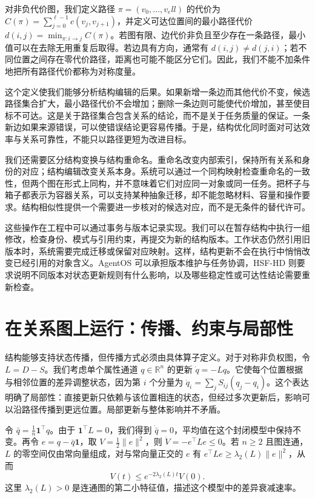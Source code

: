 对非负代价图，我们定义路径 $\pi=(v_0,\ldots,v_ell)$ 的代价为 $C(\pi)=\sum_{j=0}^{\ell-1}c(v_j,v_{j+1})$，并定义可达位置间的最小路径代价 $d(i,j)=\min_{\pi:i\to j}C(\pi)$。若图有限、边代价非负且至少存在一条路径，最小值可以在去除无用重复后取得。若边具有方向，通常有 $d(i,j)\neq d(j,i)$；若不同位置之间存在零代价路径，距离也可能不能区分它们。因此，我们不能不加条件地把所有路径代价都称为对称度量。

这个定义使我们能够分析结构编辑的后果。如果新增一条边而其他代价不变，候选路径集合扩大，最小路径代价不会增加；删除一条边则可能使代价增加，甚至使目标不可达。这是关于路径集合包含关系的结论，而不是关于任务质量的保证。一条新边如果来源错误，可以使错误结论更容易传播。于是，结构优化同时面对可达效率与关系可靠性，不能只以路径更短为改进目标。

我们还需要区分结构变换与结构重命名。重命名改变内部索引，保持所有关系和身份的对应；结构编辑改变关系本身。系统可以通过一个同构映射检查重命名的一致性，但两个图在形式上同构，并不意味着它们对应同一对象或同一任务。把杯子与箱子都表示为容器关系，可以支持某种抽象迁移，却不能忽略材料、容量和操作要求。结构相似性提供一个需要进一步核对的候选对应，而不是无条件的替代许可。

这些操作在工程中可以通过事务与版本记录实现。我们可以在暂存结构中执行一组修改，检查身份、模式与引用约束，再提交为新的结构版本。工作状态仍然引用旧版本时，系统需要完成迁移或保留对应映射。这样，结构更新不会在执行中悄悄改变已经引用的对象含义。AgentOS 可以承担版本维护与任务协调，HSF-HD 则要求说明不同版本对状态更新规则有什么影响，以及哪些稳定性或可达性结论需要重新检查。

\section{在关系图上运行：传播、约束与局部性}
\label{sec:base_manifold}

结构能够支持状态传播，但传播方式必须由具体算子定义。对于对称非负权图，令 $L=D-S$。我们考虑单个属性通道 $q\in\mathbb{R}^n$ 的更新 $\dot q=-Lq$。它使每个位置根据与相邻位置的差异调整状态，因为第 $i$ 个分量为 $\dot q_i=\sum_jS_{ij}(q_j-q_i)$。这个表达明确了局部性：直接更新只依赖与该位置相连的状态，但经过多次更新后，影响可以沿路径传播到更远位置。局部更新与整体影响并不矛盾。

令 $\bar q=\frac1n\mathbf{1}^\top q$。由于 $\mathbf{1}^\top L=0$，我们得到 $\dot{\bar q}=0$，平均值在这个封闭模型中保持不变。再令 $e=q-\bar q\mathbf{1}$，取 $V=\tfrac12\|e\|^2$，则 $\dot V=-e^\top Le\leq0$。若 $n\geq2$ 且图连通，$L$ 的零空间仅由常向量组成，对与常向量正交的 $e$ 有 $e^\top Le\geq\lambda_2(L)\|e\|^2$，从而
\begin{equation}
 V(t)\leq e^{-2\lambda_2(L)t}V(0).
\end{equation}
这里 $\lambda_2(L)>0$ 是连通图的第二小特征值，描述这个模型中的差异衰减速率。

